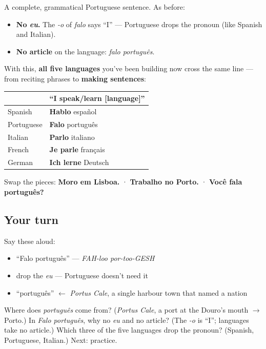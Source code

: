 A complete, grammatical Portuguese sentence. As before:

\begin{itemize}
\raggedright
  \item \textbf{No \emph{eu}.} The \emph{-o} of \emph{falo} says \textquotedblleft{}I\textquotedblright{} — Portuguese drops the pronoun (like Spanish and Italian).
  \item \textbf{No article} on the language: \emph{falo português}.
\end{itemize}

With this, \textbf{all five languages} you've been building now cross the same line — from reciting phrases to \textbf{making sentences}:

\noindent
\begin{tabularx}{\linewidth}{@{}>{\raggedright\arraybackslash}X>{\raggedright\arraybackslash}X@{}}
\toprule
\textbf{} & \textbf{\textquotedblleft{}I speak/learn {[}language{]}\textquotedblright{}} \\
\midrule
Spanish & \textbf{Hablo} español \\
Portuguese & \textbf{Falo} português \\
Italian & \textbf{Parlo} italiano \\
French & \textbf{Je parle} français \\
German & \textbf{Ich lerne} Deutsch \\
\bottomrule
\end{tabularx}

Swap the pieces: \textbf{Moro em Lisboa.} · \textbf{Trabalho no Porto.} · \textbf{Você fala português?}

\subsection*{Your turn}
Say these aloud:

\begin{itemize}
\raggedright
  \item \textquotedblleft{}Falo português\textquotedblright{} — \emph{FAH-loo por-too-GESH}
  \item drop the \emph{eu} — Portuguese doesn't need it
  \item \textquotedblleft{}português\textquotedblright{} $\leftarrow$ \emph{Portus Cale}, a single harbour town that named a nation
\end{itemize}

\begin{tcolorbox}[breakable,colback=teal!4,colframe=teal!35!black,title={Before you move on}]
Where does \emph{português} come from? (\emph{Portus Cale}, a port at the Douro's mouth $\to$ Porto.) In \emph{Falo português}, why no \emph{eu} and no article? (The \emph{-o} is \textquotedblleft{}I\textquotedblright{}; languages take no article.) Which three of the five languages drop the pronoun? (Spanish, Portuguese, Italian.) Next: practice.
\end{tcolorbox}
